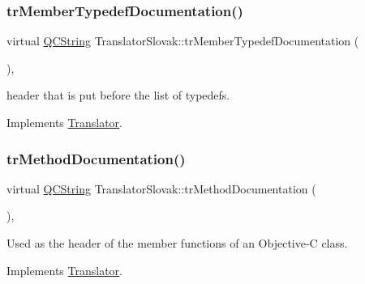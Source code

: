 \mbox{\label{class_translator_slovak_af683538686cc6aeaa8aef61445787daa}} 
\subsubsection{\texorpdfstring{trMemberTypedefDocumentation()}{trMemberTypedefDocumentation()}}
{\footnotesize\ttfamily virtual \mbox{\hyperlink{class_q_c_string}{Q\+C\+String}} Translator\+Slovak\+::tr\+Member\+Typedef\+Documentation (\begin{DoxyParamCaption}{ }\end{DoxyParamCaption})\hspace{0.3cm}{\ttfamily [inline]}, {\ttfamily [virtual]}}

header that is put before the list of typedefs. 

Implements \mbox{\hyperlink{class_translator}{Translator}}.

\mbox{\label{class_translator_slovak_a5a636c2bbe0fe14640d4e0f8be2f91c6}} 
\subsubsection{\texorpdfstring{trMethodDocumentation()}{trMethodDocumentation()}}
{\footnotesize\ttfamily virtual \mbox{\hyperlink{class_q_c_string}{Q\+C\+String}} Translator\+Slovak\+::tr\+Method\+Documentation (\begin{DoxyParamCaption}{ }\end{DoxyParamCaption})\hspace{0.3cm}{\ttfamily [inline]}, {\ttfamily [virtual]}}

Used as the header of the member functions of an Objective-\/C class. 

Implements \mbox{\hyperlink{class_translator}{Translator}}.

\mbox{\label{class_translator_slovak_a08c192c98eb8515b9a686a03c080ad46}} 
